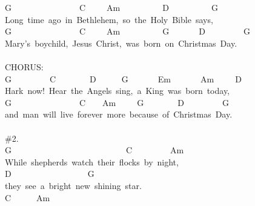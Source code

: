 \documentclass[]{book}
\begin{document}
G~~~~~~~~~~~~~~~~C~~~~~Am~~~~~~~~~~D~~~~~~~~~~G~\\
Long~time~ago~in~Bethlehem,~so~the~Holy~Bible~says,~~\\
G~~~~~~~~~~~~~~~~C~~~~~Am~~~~~~~~~~G~~~~~~~D~~~~~~~~~G~\\
Mary's~boychild,~Jesus~Christ,~was~born~on~Christmas~Day.~\\
~\\
CHORUS:\\
G~~~~~~~~~C~~~~~~~~D~~~~~~G~~~~~~~Em~~~~~~~Am~~~~~D~\\
Hark~now!~Hear~the~Angels~sing,~a~King~was~born~today,~\\
\hspace*{0.333em}\hspace*{0.333em}\hspace*{0.333em}\hspace*{0.333em}G~~~~~~~~~~~~~~~~C~~~~Am~~~~~G~~~~~~~~D~~~~~~~~~G~\\
and~man~will~live~forever~more~because~of~Christmas~Day.~\\
\hspace*{0.333em}\hspace*{0.333em}\\
\#2.~~~\\
G~~~~~~~~~~~~~~~~~~~~~~~~~~~C~~~~~~~~~Am~\\
While~shepherds~watch~their~flocks~by~night,~\\
\hspace*{0.333em}\hspace*{0.333em}\hspace*{0.333em}\hspace*{0.333em}\hspace*{0.333em}\hspace*{0.333em}\hspace*{0.333em}\hspace*{0.333em}\hspace*{0.333em}\hspace*{0.333em}\hspace*{0.333em}D~~~~~~~~~~~~~~~~~~G~\\
they~see~a~bright~new~shining~star.~\\
\hspace*{0.333em}\hspace*{0.333em}\hspace*{0.333em}\hspace*{0.333em}\hspace*{0.333em}\hspace*{0.333em}\hspace*{0.333em}\hspace*{0.333em}\hspace*{0.333em}\hspace*{0.333em}\hspace*{0.333em}\hspace*{0.333em}\hspace*{0.333em}\hspace*{0.333em}\hspace*{0.333em}\hspace*{0.333em}\hspace*{0.333em}\hspace*{0.333em}C~~~~~~Am~\\
\end{document}
